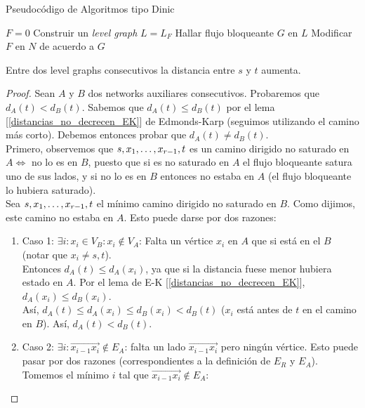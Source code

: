 \begin{algorithm}
\caption{Pseudocódigo de Algoritmos tipo Dinic}
\begin{algorithmic}
\State $F = 0$
    \State Construir un \textit{level graph} $L = L_F$
    \State Hallar flujo bloqueante $G$ en $L$
    \State Modificar $F$ en $N$ de acuerdo a $G$
\EndWhile

\end{algorithmic}
\end{algorithm}

\begin{theorem}
Entre dos level graphs consecutivos la distancia entre $s$ y $t$ aumenta.
\end{theorem}

\begin{proof}
Sean $A$ y $B$ dos networks auxiliares consecutivos. Probaremos que $d_A(t) < d_B(t)$. 
Sabemos que $d_A(t) \le d_B(t)$ por el lema [\ref{distancias_no_decrecen_EK}] de Edmonds-Karp (seguimos utilizando el camino más corto).
Debemos entonces probar que $d_A(t) \neq d_B(t)$.\\
Primero, observemos que $s, x_1, \mathellipsis, x_{r-1}, t$ es un camino dirigido no saturado en $A \iff$ no lo es en $B$, puesto que si es no saturado en $A$ el flujo bloqueante satura uno de sus lados, y si no lo es en $B$ entonces no estaba en $A$ (el flujo bloqueante lo hubiera saturado).\\
Sea $s, x_1, \mathellipsis, x_{r-1}, t$ el mínimo camino dirigido no saturado en $B$. Como dijimos, este camino no estaba en $A$. Esto puede darse por dos razones:

\begin{enumerate}
    \item Caso 1: $\exists i : x_i \in V_B : x_i \notin V_A$: Falta un vértice $x_i$ en $A$ que si está en el $B$ (notar que $x_i \neq s,t$).\\
    Entonces $d_A(t) \le d_A(x_i)$, ya que si la distancia fuese menor hubiera estado en $A$. Por el lema de E-K [\ref{distancias_no_decrecen_EK}], $d_A(x_i) \le d_B(x_i)$.\\
    Así, $d_{A}(t) \le d_{A}(x_i) \le d_{B}(x_i) < d_{B}(t)$ ($x_i$ está antes de $t$ en el camino en $B$). Así, $d_A(t) < d_B(t)$.
    
    \item Caso 2: $\exists i : \overrightarrow{x_{i-1} x_i} \notin E_A$: falta un lado $\overrightarrow{x_{i-1} x_{i}}$ pero ningún vértice. 
    Esto puede pasar por dos razones (correspondientes a la definición de $E_R$ y $E_A$). \\
    Tomemos el mínimo $i$ tal que $\overrightarrow{x_{i-1} x_{i}} \notin E_A$:
    

\end{enumerate}
\end{proof}
